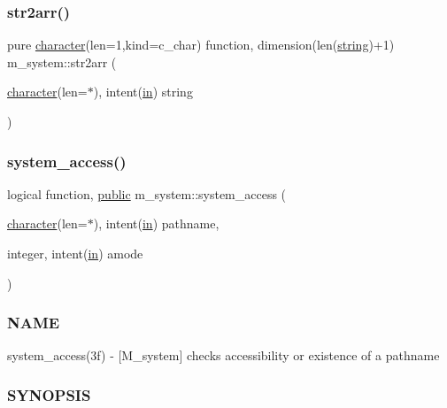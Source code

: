 \subsubsection{\texorpdfstring{str2arr()}{str2arr()}}
{\footnotesize\ttfamily pure \hyperlink{option__stopwatch_83_8txt_abd4b21fbbd175834027b5224bfe97e66}{character}(len=1,kind=c\+\_\+char) function, dimension(len(\hyperlink{what__overview_81_8txt_a74cb7e955273b9f9157b4f0c18a38849}{string})+1) m\+\_\+system\+::str2arr (\begin{DoxyParamCaption}\item[{\hyperlink{option__stopwatch_83_8txt_abd4b21fbbd175834027b5224bfe97e66}{character}(len=$\ast$), intent(\hyperlink{M__journal_83_8txt_afce72651d1eed785a2132bee863b2f38}{in})}]{string }\end{DoxyParamCaption})\hspace{0.3cm}{\ttfamily [private]}}

\mbox{\label{namespacem__system_a4687a363acbb7084a51bc77844789275}} 
\subsubsection{\texorpdfstring{system\+\_\+access()}{system\_access()}}
{\footnotesize\ttfamily logical function, \hyperlink{M__stopwatch_83_8txt_a2f74811300c361e53b430611a7d1769f}{public} m\+\_\+system\+::system\+\_\+access (\begin{DoxyParamCaption}\item[{\hyperlink{option__stopwatch_83_8txt_abd4b21fbbd175834027b5224bfe97e66}{character}(len=$\ast$), intent(\hyperlink{M__journal_83_8txt_afce72651d1eed785a2132bee863b2f38}{in})}]{pathname,  }\item[{integer, intent(\hyperlink{M__journal_83_8txt_afce72651d1eed785a2132bee863b2f38}{in})}]{amode }\end{DoxyParamCaption})}



\subsubsection*{N\+A\+ME}

system\+\_\+access(3f) -\/ \mbox{[}M\+\_\+system\mbox{]} checks accessibility or existence of a pathname 

\subsubsection*{S\+Y\+N\+O\+P\+S\+IS}

